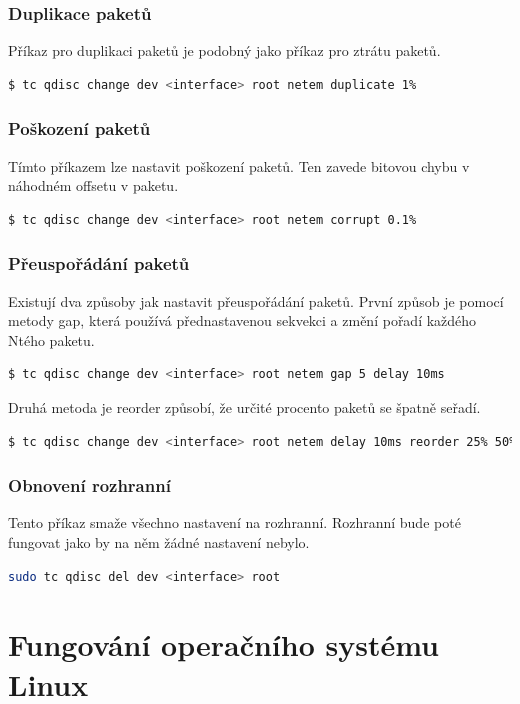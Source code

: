\subsection*{Duplikace paketů}
Příkaz pro duplikaci paketů je podobný jako příkaz pro ztrátu paketů.
\begin{lstlisting}[language=bash]
    $ tc qdisc change dev <interface> root netem duplicate 1%
\end{lstlisting}

\subsection*{Poškození paketů}
Tímto příkazem lze nastavit poškození paketů. Ten zavede bitovou chybu v náhodném offsetu v paketu.
\begin{lstlisting}[language=bash]
    $ tc qdisc change dev <interface> root netem corrupt 0.1%
\end{lstlisting}

\subsection*{Přeuspořádání paketů}
Existují dva způsoby jak nastavit přeuspořádání paketů.
První způsob je pomocí metody gap, která používá přednastavenou sekvekci a změní pořadí každého Ntého paketu.
\begin{lstlisting}[language=bash]
    $ tc qdisc change dev <interface> root netem gap 5 delay 10ms
\end{lstlisting}
Druhá metoda je reorder způsobí, že určité procento paketů se špatně seřadí.
\begin{lstlisting}[language=bash]
    $ tc qdisc change dev <interface> root netem delay 10ms reorder 25% 50%
\end{lstlisting}

\subsection*{Obnovení rozhranní}
Tento příkaz smaže všechno nastavení na rozhranní. Rozhranní bude poté fungovat jako by na něm žádné nastavení nebylo.
\begin{lstlisting}[language=bash]
    sudo tc qdisc del dev <interface> root
\end{lstlisting}



\chapter{Fungování operačního systému Linux}
\label{sec:FungovaniOperacnihoSystemuLinux}

